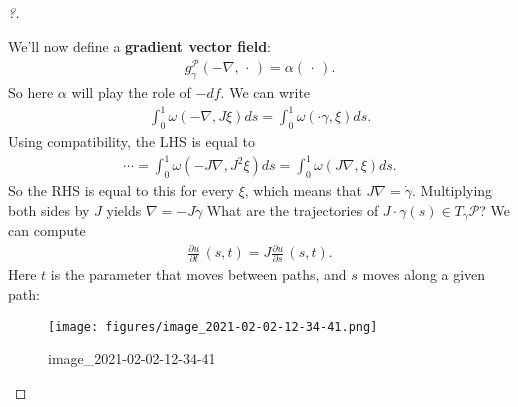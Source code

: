 \begin{proof}[?]
\begin{exercise}[?]
\end{exercise}

We'll now define a \textbf{gradient vector field}:
\begin{align*}
g_{\gamma}^\mathcal{P}( -\nabla, {\,\cdot\,}) = \alpha({\,\cdot\,})
.\end{align*}
So here \(\alpha\) will play the role of \(-df\). We can write
\begin{align*}
\int_0^1 \omega( - \nabla, J \xi) ds = \int_0^1 \omega( \cdot{\gamma}, \xi) ds
.\end{align*}
Using compatibility, the LHS is equal to
\begin{align*}
\cdots = \int_0^1 \omega(-J \nabla, J^2 \xi) ds 
= \int_0^1 \omega(J \nabla, \xi) ds
.\end{align*}
So the RHS is equal to this for every \(\xi\), which means that
\(J \nabla= \dot{\gamma}\). Multiplying both sides by \(J\) yields
\(\nabla= -J \dot{\gamma}\) What are the trajectories of
\(J \cdot{ \gamma}(s)\in T_{\gamma} \mathcal{P}\)? We can compute
\begin{align*}
{\frac{\partial u}{\partial t}\,} (s, t) = J {\frac{\partial u}{\partial s}\,}(s, t)
.\end{align*}
Here \(t\) is the parameter that moves between paths, and \(s\) moves
along a given path:

\begin{figure}
\centering
\texttt{[image: figures/image\_2021-02-02-12-34-41.png]}
\caption{image\_2021-02-02-12-34-41}
\end{figure}

\end{proof}

\cleardoublepage

\renewcommand{\listtheoremname}{}
\listoftheorems[ignoreall,show={definition}, numwidth=3.5em]
\cleardoublepage

\renewcommand{\listtheoremname}{}
\listoftheorems[ignoreall,show={theorem,proposition}, numwidth=3.5em]
\cleardoublepage

\renewcommand{\listtheoremname}{}
\listoftheorems[ignoreall,show={exercise}, numwidth=3.5em]
\cleardoublepage

\listoffigures
\cleardoublepage


\printbibliography[title=Bibliography]



